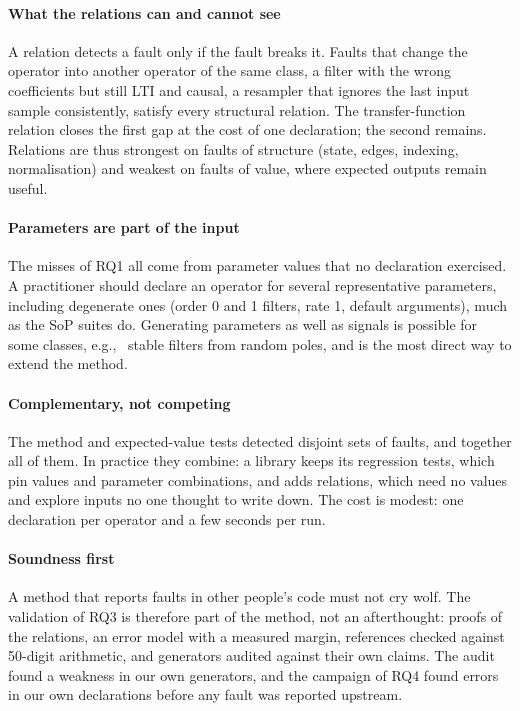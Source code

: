 \documentclass[10pt,conference]{IEEEtran}
\newcommand{\eg}{e.g.,\ }
\begin{document}
\paragraph*{What the relations can and cannot see} A relation detects a fault
only if the fault breaks it. Faults that change the operator into another
operator of the same class, a filter with the wrong coefficients but still LTI
and causal, a resampler that ignores the last input sample consistently,
satisfy every structural relation. The transfer-function relation closes the
first gap at the cost of one declaration; the second remains. Relations are
thus strongest on faults of structure (state, edges, indexing, normalisation)
and weakest on faults of value, where expected outputs remain useful.

\paragraph*{Parameters are part of the input} The misses of RQ1 all come from
parameter values that no declaration exercised. A practitioner should declare
an operator for several representative parameters, including degenerate ones
(order 0 and 1 filters, rate 1, default arguments), much as the SoP suites do.
Generating parameters as well as signals is possible for some classes, \eg
stable filters from random poles, and is the most direct way to extend the
method.

\paragraph*{Complementary, not competing} The method and expected-value tests
detected disjoint sets of faults, and together all of them. In practice they
combine: a library keeps its regression tests, which pin values and parameter
combinations, and adds relations, which need no values and explore inputs no
one thought to write down. The cost is modest: one declaration per operator and
a few seconds per run.

\paragraph*{Soundness first} A method that reports faults in other people's code
must not cry wolf. The validation of RQ3 is therefore part of the method, not an
afterthought: proofs of the relations, an error model with a measured margin,
references checked against 50-digit arithmetic, and generators audited against
their own claims. The audit found a weakness in our own generators, and the
campaign of RQ4 found \campaignTriaged{} errors in our own declarations before any fault was
reported upstream.
\end{document}
